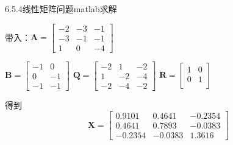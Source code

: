\documentclass[10pt]{beamer}
\begin{document}
  \begin{frame}[allowframebreaks]{6.5.4线性矩阵问题matlab求解}
  
  带入：$\boldsymbol{A}=\begin{bmatrix}
  -2 & -3 & -1\\ 
  -3 & -1 & -1\\ 
  1 & 0 & -4
  \end{bmatrix}$
  
  $\boldsymbol{B}=\begin{bmatrix}
  -1 & 0 \\ 
  0 & -1\\ 
  -1 & -1
  \end{bmatrix}$
  $\boldsymbol{Q}=\begin{bmatrix}
  -2 & 1 & -2\\ 
  1 & -2 & -4\\ 
  -2 & -4 & -2
  \end{bmatrix}$
  $\boldsymbol{R}=\begin{bmatrix}
  1 & 0 \\ 
  0 & 1\\ 
  \end{bmatrix}$
  
  得到\[\boldsymbol{X}=\begin{bmatrix}
  0.9101 & 0.4641 & -0.2354\\ 
  0.4641 & 0.7893 & -0.0383\\ 
  -0.2354 & -0.0383 & 1.3616
  \end{bmatrix}\]
  
  
  \end{frame}
  
\end{document}
